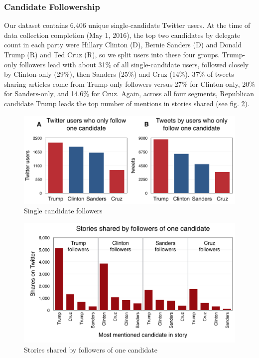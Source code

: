 \documentclass[letterpaper]{article}
\begin{document}
\subsubsection{Candidate Followership}
Our dataset contains 6,406 unique single-candidate Twitter users. At the time of data collection completion (May 1, 2016), the top two candidates by delegate count in each party were Hillary Clinton (D), Bernie Sanders (D) and Donald Trump (R) and Ted Cruz (R), so we split users into these four groups. Trump-only followers lead with about 31\% of all single-candidate users, followed closely by Clinton-only (29\%), then Sanders (25\%) and Cruz (14\%). 37\% of tweets sharing articles come from Trump-only followers versus 27\% for Clinton-only, 20\% for Sanders-only, and 14.6\% for Cruz. Again, across all four segments, Republican candidate Trump leads the top number of mentions in stories shared (see fig. \ref{fig:who-shares-what}).
 
\begin{figure}[t!]  
\centering 
  \includegraphics[width=\columnwidth]{single-candid-charts}  
   \caption{Single candidate followers
     \label{fig:single-candid-charts}}
\end{figure} 

\begin{figure}[t!] 
\centering 
 \includegraphics[width=1.0\columnwidth]{who-shares-what}  
  \caption{Stories shared by followers of one candidate 
    \label{fig:who-shares-what}}
\end{figure}
\end{document}
